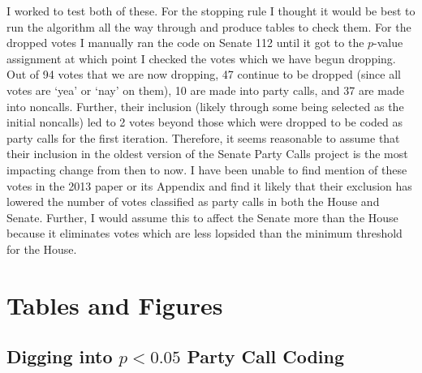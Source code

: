 \documentclass[12pt]{article}
\begin{document}
I worked to test both of these. For the stopping rule I thought it would be best to run the algorithm all the way through and produce tables to check them. For the dropped votes I manually ran the code on Senate 112 until it got to the $p$-value assignment at which point I checked the votes which we have begun dropping. Out of 94 votes that we are now dropping, 47 continue to be dropped (since all votes are `yea' or `nay' on them), 10 are made into party calls, and 37 are made into noncalls. Further, their inclusion (likely through some being selected as the initial noncalls) led to 2 votes beyond those which were dropped to be coded as party calls for the first iteration. Therefore, it seems reasonable to assume that their inclusion in the oldest version of the Senate Party Calls project is the most impacting change from then to now. I have been unable to find mention of these votes in the 2013 paper or its Appendix and find it likely that their exclusion has lowered the number of votes classified as party calls in both the House and Senate. Further, I would assume this to affect the Senate more than the House because it eliminates votes which are less lopsided than the minimum threshold for the House.





\section{Tables and Figures}

\subsection{Digging into $ p < 0.05 $ Party Call Coding}

\end{document}
